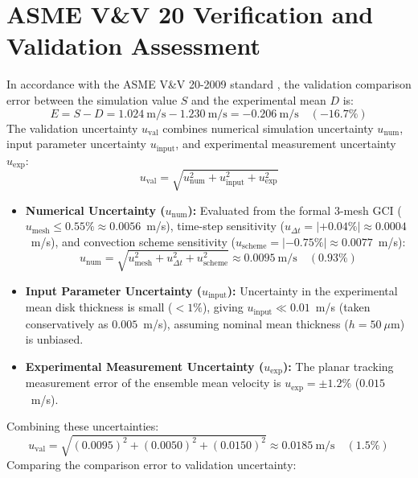 \documentclass[11pt,a4paper]{article}
\begin{document}
\section{ASME V\&V 20 Verification and Validation Assessment}

In accordance with the ASME V\&V 20-2009 standard \cite{asme2009}, the validation comparison error between the simulation value $S$ and the experimental mean $D$ is:
\begin{equation}
E = S - D = 1.024\ \mathrm{m/s} - 1.230\ \mathrm{m/s} = -0.206\ \mathrm{m/s} \quad (-16.7\%)
\end{equation}
The validation uncertainty $u_{\mathrm{val}}$ combines numerical simulation uncertainty $u_{\mathrm{num}}$, input parameter uncertainty $u_{\mathrm{input}}$, and experimental measurement uncertainty $u_{\mathrm{exp}}$:
\begin{equation}
u_{\mathrm{val}} = \sqrt{u_{\mathrm{num}}^2 + u_{\mathrm{input}}^2 + u_{\mathrm{exp}}^2}
\end{equation}
\begin{itemize}
    \item \textbf{Numerical Uncertainty ($u_{\mathrm{num}}$):} Evaluated from the formal 3-mesh GCI ($u_{\mathrm{mesh}} \le 0.55\% \approx 0.0056$~m/s), time-step sensitivity ($u_{\Delta t} = |+0.04\%| \approx 0.0004$~m/s), and convection scheme sensitivity ($u_{\mathrm{scheme}} = |-0.75\%| \approx 0.0077$~m/s):
    \begin{equation}
    u_{\mathrm{num}} = \sqrt{u_{\mathrm{mesh}}^2 + u_{\Delta t}^2 + u_{\mathrm{scheme}}^2} \approx 0.0095\ \mathrm{m/s} \quad (0.93\%)
    \end{equation}
    \item \textbf{Input Parameter Uncertainty ($u_{\mathrm{input}}$):} Uncertainty in the experimental mean disk thickness is small ($< 1\%$), giving $u_{\mathrm{input}} \ll 0.01$~m/s (taken conservatively as $0.005$~m/s), assuming nominal mean thickness ($h = 50\ \mu$m) is unbiased.
    \item \textbf{Experimental Measurement Uncertainty ($u_{\mathrm{exp}}$):} The planar tracking measurement error of the ensemble mean velocity is $u_{\mathrm{exp}} = \pm 1.2\%$ ($0.015$~m/s).
\end{itemize}
Combining these uncertainties:
\begin{equation}
u_{\mathrm{val}} = \sqrt{(0.0095)^2 + (0.0050)^2 + (0.0150)^2} \approx 0.0185\ \mathrm{m/s} \quad (1.5\%)
\end{equation}
Comparing the comparison error to validation uncertainty:
\end{document}
